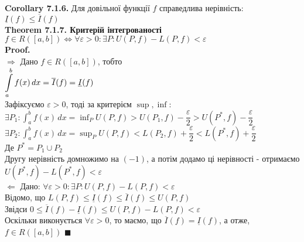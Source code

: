 \documentclass[a4paper, 14pt]{extarticle}
\def\huge{\displaystyle}
\def\bigline{\vspace{5mm}\\}
\def\th#1{\textbf{Theorem {#1}}}
\def\crl#1{\textbf{Corollary {#1}}}
\def\proof{\textbf{Proof.}\\}
\def\bigline{\vspace{5mm}\\}
\def\qed{$\blacksquare$}
\begin{document}
\crl{7.1.6.} Для довільної функції $f$ справедлива нерівність: \\ $\underline{I}(f) \leq \overline{I}(f)$
\bigline
\th{7.1.7. Критерій інтегрованості}\\
$f \in R([a,b]) \iff \forall \varepsilon > 0: \exists P: U(P,f) - L(P,f) < \varepsilon$\\
\proof
$\boxed{\Rightarrow}$ Дано $f \in R([a,b])$, тобто\\
$\huge \int\displaylimits_a^b f(x)\,dx = \overline{I}(f) = \underline{I}(f)$\\
Зафіксуємо $\varepsilon > 0$, тоді за критерієм $\sup, \inf$:\\
$\exists P_1: \huge\int_a^b f(x)\,dx = \inf_P U(P, f) > U(P_1,f) - \dfrac{\varepsilon}{2} > U(P^*,f) - \dfrac{\varepsilon}{2}$\\
$\exists P_2: \huge\int_a^b f(x)\,dx = \sup_P U(P, f) < L(P_2,f) + \dfrac{\varepsilon}{2} < L(P^*,f) + \dfrac{\varepsilon}{2}$\\
Де $P^* = P_1 \cup P_2$\\
Другу нерівність домножимо на $(-1)$, а потім додамо ці нерівності - отримаємо\\
$U(P^*,f) - L(P^*,f) < \varepsilon$
\bigline
$\boxed{\Leftarrow}$ Дано: $\forall \varepsilon > 0: \exists P: U(P,f) - L(P,f) < \varepsilon$\\
Відомо, що $L(P,f) \leq \underline{I}(f) \leq \overline{I}(f) \leq U(P,f)$\\
Звідси $0 \leq \overline{I}(f) - \underline{I}(f) \leq U(P,f) - L(P,f) < \varepsilon$\\
Оскільки виконується $\forall \varepsilon > 0$, то маємо, що $\overline{I}(f) = \underline{I}(f)$, а отже, $f \in R([a,b])$ \qed
\bigline
\end{document}
